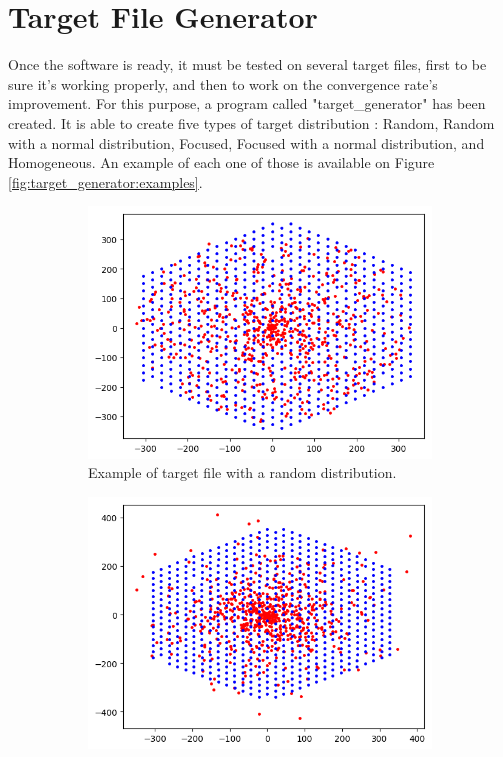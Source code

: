 \section{Target File Generator} \label{target_generator}

Once the software is ready, it must be tested on several target files, first to be sure it's working properly, and then to work on the convergence rate's improvement. For this purpose, a program called "target_generator" has been created. It is able to create five types of target distribution : Random, Random with a normal distribution, Focused, Focused with a normal distribution, and Homogeneous. An example of each one of those is available on Figure \ref{fig:target_generator:examples}.
\\

\begin{figure}[h]
	\begin{center}
		\begin{subfigure}{0.32\textwidth}
			\includegraphics[width=\textwidth]{target/random.png}
			\caption{Example of target file with a random distribution.}
		\end{subfigure}
		\begin{subfigure}{0.32\textwidth}
			\includegraphics[width=\textwidth]{target/random_normal.png}

\end{subfigure}
\end{center}
\end{figure}
